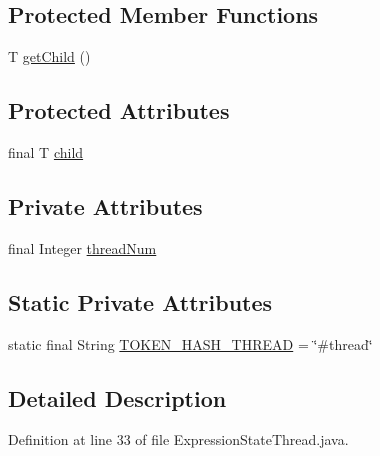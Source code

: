 \subsection*{Protected Member Functions}
\begin{DoxyCompactItemize}
\item 
T \hyperlink{classgov_1_1nasa_1_1jpf_1_1inspector_1_1server_1_1expression_1_1_expression_state_unary_operator_a150bac338d6557f79ca185d3f6ad6e06}{get\+Child} ()
\end{DoxyCompactItemize}
\subsection*{Protected Attributes}
\begin{DoxyCompactItemize}
\item 
final T \hyperlink{classgov_1_1nasa_1_1jpf_1_1inspector_1_1server_1_1expression_1_1_expression_state_unary_operator_a66041b1f569a361549e28a00f7ca5f2f}{child}
\end{DoxyCompactItemize}
\subsection*{Private Attributes}
\begin{DoxyCompactItemize}
\item 
final Integer \hyperlink{classgov_1_1nasa_1_1jpf_1_1inspector_1_1server_1_1expression_1_1expressions_1_1_expression_state_thread_a4db41aca6ee66ae2da3753785bed3167}{thread\+Num}
\end{DoxyCompactItemize}
\subsection*{Static Private Attributes}
\begin{DoxyCompactItemize}
\item 
static final String \hyperlink{classgov_1_1nasa_1_1jpf_1_1inspector_1_1server_1_1expression_1_1expressions_1_1_expression_state_thread_ae6796ff4cecc1a6d33fb67e9927a03ce}{T\+O\+K\+E\+N\+\_\+\+H\+A\+S\+H\+\_\+\+T\+H\+R\+E\+AD} = \char`\"{}\#thread\char`\"{}
\end{DoxyCompactItemize}


\subsection{Detailed Description}


Definition at line 33 of file Expression\+State\+Thread.\+java.



